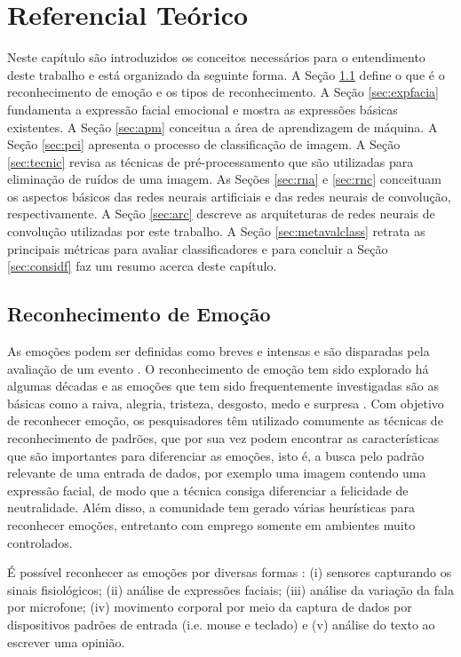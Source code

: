 \chapter{Referencial Teórico}\label{sec:conceitos}
Neste capítulo são introduzidos os conceitos necessários para o entendimento deste trabalho e está organizado da seguinte forma. A Seção \ref{sec:recemo} define o que é o reconhecimento de emoção e os tipos de reconhecimento. A Seção \ref{sec:expfacia} fundamenta a expressão facial emocional e mostra as expressões básicas existentes. A Seção \ref{sec:apm} conceitua a área de aprendizagem de máquina. A Seção \ref{sec:pci} apresenta o processo de classificação de imagem. A Seção \ref{sec:tecnic} revisa as técnicas de pré-processamento que são utilizadas para eliminação de ruídos de uma imagem. As Seções \ref{sec:rna} e \ref{sec:rnc} conceituam os aspectos básicos das redes neurais artificiais e das redes neurais de convolução, respectivamente. A Seção \ref{sec:arc} descreve as arquiteturas de redes neurais de convolução utilizadas por este trabalho. A Seção \ref{sec:metavalclass} retrata as principais métricas para avaliar classificadores e para concluir a Seção \ref{sec:considf} faz um resumo acerca deste capítulo.   

\section{Reconhecimento de Emoção}\label{sec:recemo}
As emoções podem ser definidas como breves e intensas e são disparadas pela avaliação de um evento \citep{scherer2000psychological}. O reconhecimento de emoção tem sido explorado há algumas décadas e as emoções que tem sido frequentemente investigadas são as básicas como a raiva, alegria, tristeza, desgosto, medo e surpresa \citep{ekman1994}. Com objetivo de reconhecer emoção, os pesquisadores têm utilizado comumente as técnicas de reconhecimento de padrões, que por sua vez podem encontrar as características que são importantes para diferenciar as emoções, isto é, a busca pelo padrão relevante de uma entrada de dados, por exemplo uma imagem contendo uma expressão facial, de modo que a técnica consiga diferenciar a felicidade de neutralidade. Além disso, a comunidade tem gerado várias heurísticas para reconhecer emoções, entretanto com emprego somente em ambientes muito controlados. 

É possível reconhecer as emoções por diversas formas \citep{nasoz2004emotion}: (i) sensores capturando os sinais fisiológicos; (ii) análise de expressões faciais; (iii) análise da variação da fala por microfone; (iv) movimento corporal por meio da captura de dados por dispositivos padrões de entrada (i.e. mouse e teclado) e (v) análise do texto ao escrever uma opinião.

